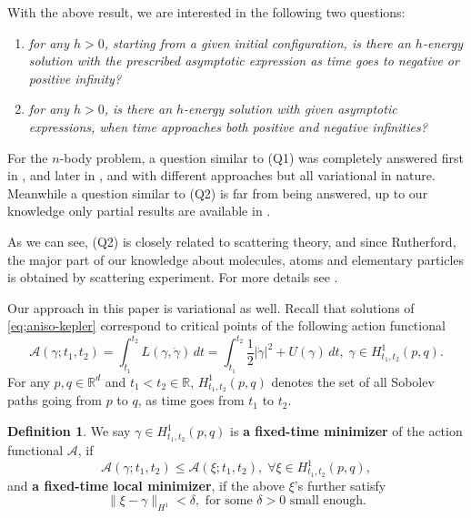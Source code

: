 \documentclass[11pt]{amsart}
\newcommand{\rr}{\mathbb R}
\newcommand{\A}{\mathcal A}
\newcommand{\gm}{\gamma}
\newcommand{\dl}{\delta}
\newcommand{\ey}{\frac{1}{2}}
\theoremstyle{plain}
\theoremstyle{definition}
\newtheorem{dfn}{Definition}[section]
\theoremstyle{remark}
\begin{document}
 



With the above result, we are interested in the following two questions: 

\begin{enumerate}
\item[(Q1):] \emph{for any $h>0$, starting from a given initial configuration, is there an $h$-energy solution with the prescribed asymptotic expression as time goes to negative or positive infinity?}

\item[(Q2):] \emph{for any $h>0$, is there an $h$-energy solution with given asymptotic expressions, when time approaches both positive and negative infinities?}
\end{enumerate}

For the $n$-body problem, a question similar to (Q1) was completely answered first in \cite{MV20}, and later in \cite{LYZ21}, \cite{Yu24} and \cite{PT24} with different approaches but all variational in nature. Meanwhile a question similar to (Q2) is far from being answered, up to our knowledge only partial results are available in \cite{DMMY20}. 

As we can see, (Q2) is closely related to scattering theory, and since Rutherford, the major part of our knowledge about molecules, atoms and elementary particles is obtained by scattering experiment. For more details see \cite[Chapter 12]{Kn18}.


Our approach in this paper is variational as well. Recall that solutions of \eqref{eq;aniso-kepler} correspond to critical points of the following action functional 
\begin{equation}
\A(\gm; t_1, t_2) = \int_{t_1}^{t_2} L(\gm, \dot{\gm}) \,dt = \int_{t_1}^{t_2} \ey |\dot{\gm}|^2 + U(\gm) \,dt, \; \gm \in H^1_{t_1, t_2}(p, q).
\end{equation}
For any $p, q \in \rr^d$ and $t_1< t_2 \in \rr$, $H^1_{t_1, t_2}(p, q)$ denotes the set of all Sobolev paths going from $p$ to $q$, as time goes from $t_1$ to $t_2$.  
 

\begin{dfn}
\label{dfn;fixed-time minimizer}  We say $\gm \in H^1_{t_1, t_2}(p, q)$ is \textbf{a fixed-time minimizer} of the action functional $\A$, if 
$$ \A(\gm; t_1, t_2) \le \A(\xi; t_1, t_2), \; \forall \xi \in H^1_{t_1, t_2}(p, q),$$
and \textbf{a fixed-time local minimizer}, if the above $\xi$'s further satisfy
$$ \|\xi -\gm\|_{H^1} < \dl, \text{ for some } \dl>0 \text{ small enough.}$$
\end{dfn}
\end{document}
